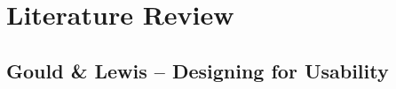 \documentclass[11pt,a4paper]{report}
\begin{document}

\clearpage\maketitle
\thispagestyle{empty}

\newpage
\tableofcontents{}
\thispagestyle{empty}


\newpage

\chapter{Literature Review}\label{ch:Literature_Review}

\section{Gould \& Lewis -- Designing for Usability}
\end{document}
